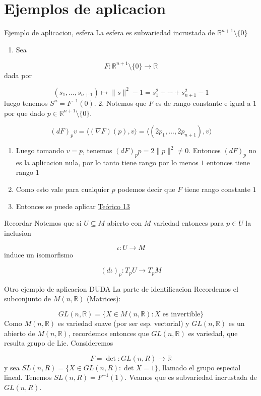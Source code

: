 \section{Ejemplos de aplicacion}
\begin{bookexample}{Ejemplo de aplicacion, esfera}
La esfera es subvariedad incrustada de $\mathbb{R}^{n+1}\setminus\{ 0 \}$

\end{bookexample}
\begin{bookproof}{}
\begin{enumerate}
\item Sea
\end{enumerate}
\[
F:\mathbb R^{n+1}\setminus\{0\}\to\mathbb R
\]
dada por

\[
(s_1,\ldots,s_{n+1})\mapsto\|s\|^2-1=s_1^2+\cdots+s_{n+1}^2-1
\]
luego tenemos $S^n=F^{-1}(0)$. 2. Notemos que $F$ es de rango constante e igual a $1$ por que dado $p\in\mathbb R^{n+1}\setminus\{0\}$.

\[
(dF)_p v=\langle(\nabla F)(p),v\rangle=\langle(2p_1,\ldots,2p_{n+1}),v\rangle
\]
\begin{enumerate}[start=3]
\item Luego tomando $v=p$, tenemos $(dF)_p p=2\|p\|^2\neq0$. Entonces $(dF)_{p}$ no es la aplicacion nula, por lo tanto tiene rango por lo menos $1$ entonces tiene rango $1$
\item Como esto vale para cualquier $p$ podemos decir que $F$ tiene rango constante $1$
\item Entonces se puede aplicar \hyperref[blk:210dde]{Teórico 13}
\end{enumerate}
\bookqed
\end{bookproof}
\begin{bookremark}{Recordar}
Notemos que si $U\subseteq M$ abierto con $M$ variedad entonces para $p\in U$ la inclusion

\[
\iota: U\rightarrow M
\]
induce un isomorfismo

\[
(d\iota)_{p}:T_{p}U\rightarrow T_{p}M
\]
\end{bookremark}
\label{blk:234f1c}
\begin{bookexample}{Otro ejemplo de aplicacion DUDA La parte de identificacion}
Recordemos el subconjunto de $M(n,\mathbb{R})$ (Matrices):

\[
GL(n,\mathbb{R})=\{X\in M(n,\mathbb{R}):X\text{ es invertible}\}
\]
Como $M(n,\mathbb{R})$ es variedad suave (por ser esp. vectorial) y $GL(n,\mathbb{R})$ es un abierto de $M(n,\mathbb{R})$, recordemos entonces que $GL(n,\mathbb{R})$ es variedad, que resulta grupo de Lie. Consideremos

\[
F=\det:GL(n,R)\to\mathbb R
\]
y sea $SL(n,R)=\{X\in GL(n,R):\det X=1\}$, llamado el grupo especial lineal. Tenemos $SL(n,R)=F^{-1}(1)$. Veamos que es subvariedad incrustada de $GL(n,R)$.

\end{bookexample}
